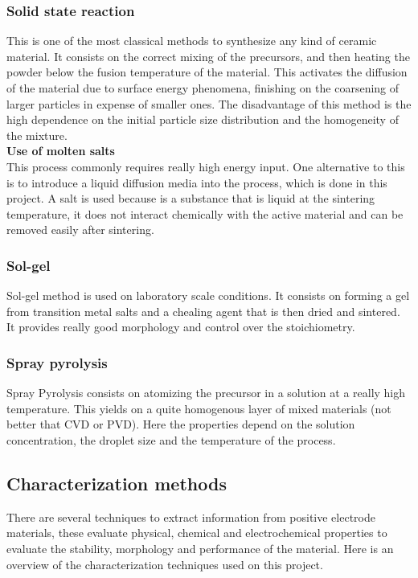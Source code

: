 \documentclass{article}
\begin{document}
\subsubsection{Solid state reaction}
This is one of the most classical methods to synthesize any kind of ceramic material. 
It consists on the correct mixing of the precursors, and then heating the powder below the fusion temperature of the material.
This activates the diffusion of the material due to surface energy phenomena, finishing on the coarsening of larger particles
in expense of smaller ones. The disadvantage of this method is the high dependence on the initial particle size distribution and 
the homogeneity of the mixture\cite{process}.\\
\textbf{Use of molten salts}\\ 
This process commonly requires really high energy input. One alternative to this 
is to introduce a liquid diffusion media into the process, which is done in this project. A salt is used
because is a substance that is liquid at the sintering temperature, it does not interact chemically with the active 
material and can be removed easily after sintering\cite{process}.
\subsubsection{Sol-gel}
Sol-gel method is used on laboratory scale conditions. It consists on forming a gel from transition 
metal salts and a chealing agent that is then dried and sintered. It provides really good morphology and control over the stoichiometry\cite{process}.
\subsubsection{Spray pyrolysis}
Spray Pyrolysis consists on atomizing the precursor in a solution at a really high temperature. This yields on a 
quite homogenous layer of mixed materials (not better that CVD or PVD). Here the properties depend on the solution concentration, the 
droplet size and the temperature of the process\cite{process}.\\ 
\subsection{Characterization methods}
There are several techniques to extract information from positive electrode materials,
these evaluate physical, chemical and electrochemical properties to evaluate the stability, morphology 
and performance of the material. Here is an overview of the characterization techniques used on this project.\\
\end{document}
